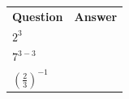 {{        \begin{center}
      \label{m38359*id67604}
    \noindent
      \tablelasttail{}
      \begin{xtabular}[t]{|l|l|}\hline
                  \textbf{Question}
                 &
                  \textbf{Answer}
     \tabularnewline{}
                  ${2}^{3}$
                 &
     \tabularnewline{}
                  ${7}^{3-3}$
                 &
     \tabularnewline{}
                  ${\left(\frac{2}{3}\right)}^{-1}$
                 &

\end{xtabular}
\end{center}}}
